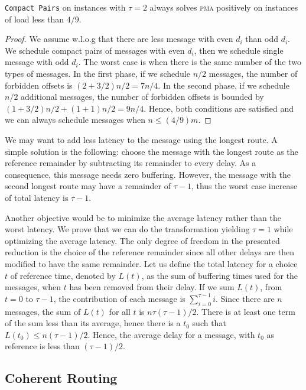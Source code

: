 \documentclass[a4paper,UKenglish,cleveref, autoref, thm-restate]{lipics-v2019}
\newcommand\pma{\textsc{pma}\xspace}
\newcommand\compactpair{\texttt{Compact Pairs}\xspace}
\begin{document}
\begin{theorem}
\compactpair on instances with $\tau =2$ always solves \pma positively on instances of load less than $4/9$.
\end{theorem}
\begin{proof}
We assume w.l.o.g that there are less message with even $d_i$ than odd $d_i$.
We schedule compact pairs of messages with even $d_i$, then we schedule single message with odd $d_i$. The worst case is when there is the same number of the two types of messages. In the first phase, if we schedule
 $n/2$ messages, the number of forbidden offsets is $(2 + 3/2)n/2 = 7n/4$. In the second phase,
 if we schedule $n/2$ additional messages, the number of forbidden offsets is bounded by 
$ (1 + 3/2) n/2  + (1 + 1)n/2 = 9n/4$. Hence, both conditions are satisfied and we can always schedule messages when $n \leq (4/9)m$.
\end{proof}


We may want to add less latency to the message using the longest route. A simple solution is the following: choose the message with the longest route as the reference remainder by subtracting its remainder to every delay. As a consequence, this message needs zero buffering. However, the message with the second longest route may have a remainder of $\tau -1$, thus the worst case increase of total latency is $\tau -1$. 

Another objective would be to minimize the average latency rather than the worst latency.
We prove that we can do the transformation yielding $\tau=1$ while optimizing the average latency. 
 The only degree of freedom in the presented reduction is the choice of the reference remainder since all other delays are then modified to have the same remainder. Let us define the total latency for a choice $t$ of reference time, denoted by $L(t)$, as the sum of buffering times used for the messages, when $t$ has been removed from their delay.
If we sum $L(t)$, from $t=0$ to $\tau-1$, the contribution of each message is $\sum_{i=0}^{\tau-1} i$. Since there are $n$ messages, the sum of $L(t)$ for all $t$ is $n \tau (\tau-1)/2$. There is at least one term of the sum less than its average, hence there is a $t_0$ such that $L(t_0) \leq n (\tau-1)/2$. Hence, the average delay for a message, with $t_0$ as reference is less than $(\tau -1)/2$.

\subsection{Coherent Routing}\label{sec:coherent}
\end{document}
